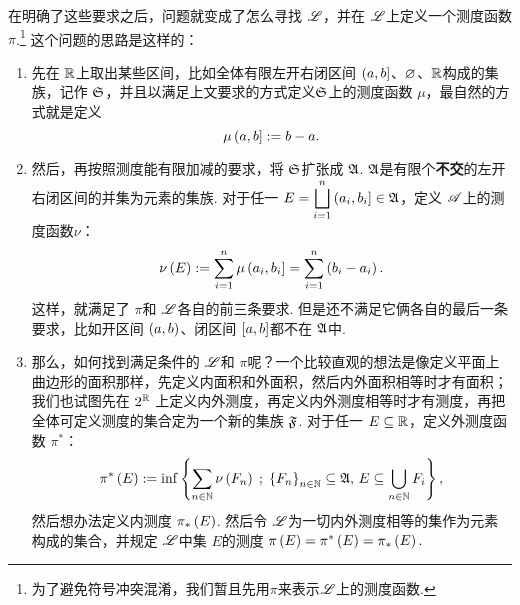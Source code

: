 在明确了这些要求之后，问题就变成了怎么寻找 $\mathscr{L}$，并在 $\mathscr{L}$上定义一个测度函数 $\pi$.\footnote{为了避免符号冲突混淆，我们暂且先用$\pi$来表示$\mathscr{L}$上的测度函数.} 这个问题的思路是这样的：
\begin{enumerate}
    \item 先在 $\mathbb{R}$上取出某些区间，比如全体有限左开右闭区间 $\left(a,b\right]$、$\varnothing$、$\mathbb{R}$构成的集族，记作 ${\mathfrak{S}}$，并且以满足上文要求的方式定义${\mathfrak{S}}$上的测度函数 $\mu$，最自然的方式就是定义 \[\mu\left(a,b\right]:= b-a.\]
    \item 然后，再按照测度能有限加减的要求，将 ${\mathfrak{S}}$扩张成 ${\mathfrak{A}}$. ${\mathfrak{A}}$是有限个\textbf{不交}的左开右闭区间的并集为元素的集族. 对于任一 $\displaystyle E=\bigsqcup_{i=1}^n \left(a_i,b_i\right]\in{\mathfrak{A}}$，定义 $\mathscr{A}$上的测度函数$\nu$： \[ \nu\left(E\right):=\sum_{i=1}^n \mu\left(a_i,b_i\right]=\sum_{i=1}^n \left(b_i-a_i\right).\] 这样，就满足了 $\pi$和 $\mathscr{L}$各自的前三条要求. 但是还不满足它俩各自的最后一条要求，比如开区间 $\left(a,b\right)$、闭区间 $\left[a,b\right]$都不在 ${\mathfrak{A}}$中.
    \item 那么，如何找到满足条件的 $\mathscr{L}$和 $\pi$呢？一个比较直观的想法是像定义平面上曲边形的面积那样，先定义内面积和外面积，然后内外面积相等时才有面积；我们也试图先在 $2^{\mathbb{R}}$ 上定义内外测度，再定义内外测度相等时才有测度，再把全体可定义测度的集合定为一个新的集族 ${\mathfrak{F}}$. 对于任一 $E\subseteq\mathbb{R}$，定义外测度函数 $\pi^*$： \[  \pi^*\left(E\right):=\inf \left\{ \sum_{n\in\mathbb{N}} \nu\left(F_n\right)\;;\;\left\{F_n\right\}_{n\in\mathbb{N}}\subseteq{\mathfrak{A}},\, E\subseteq \bigcup_{n\in\mathbb{N}}F_i \right\},  \] 然后想办法定义内测度 $\pi_*\left(E\right)$. 然后令 $\mathscr{L}$为一切内外测度相等的集作为元素构成的集合，并规定 $\mathscr{L}$中集 $E$的测度 $\pi\left(E\right)=\pi^*\left(E\right)=\pi_*\left(E\right).$


\end{enumerate}
